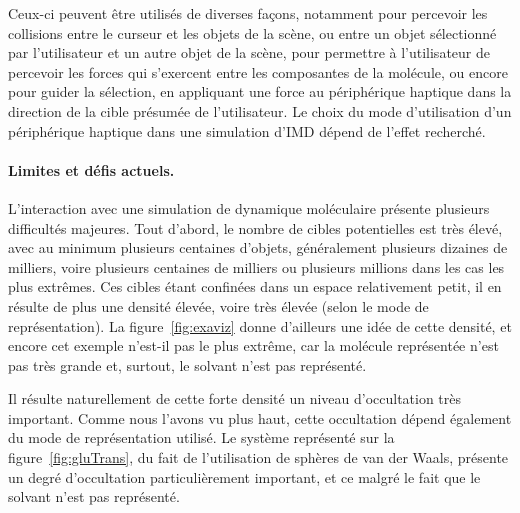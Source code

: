 	Ceux-ci peuvent être utilisés de diverses façons, notamment pour percevoir les \og collisions \fg{} entre le curseur et les objets de la scène, ou entre un objet sélectionné par l'utilisateur et un autre objet de la scène, pour permettre à l'utilisateur de percevoir les forces qui s'exercent entre les composantes de la molécule, ou encore pour guider la sélection, en appliquant une force au périphérique haptique dans la direction de la cible présumée de l'utilisateur. Le choix du mode d'utilisation d'un périphérique haptique dans une simulation d'IMD dépend de l'effet recherché.
	
	\paragraph{Limites et défis actuels.}
	L'interaction avec une simulation de dynamique moléculaire présente plusieurs difficultés majeures. Tout d'abord, le nombre de cibles potentielles est très élevé, avec au minimum plusieurs centaines d'objets, généralement plusieurs dizaines de milliers, voire plusieurs centaines de milliers ou plusieurs millions dans les cas les plus extrêmes. Ces cibles étant confinées dans un espace relativement petit, il en résulte de plus une densité élevée, voire très élevée (selon le mode de représentation). La figure~\ref{fig:exaviz} donne d'ailleurs une idée de cette densité, et encore cet exemple n'est-il pas le plus extrême, car la molécule représentée n'est pas très grande et, surtout, le solvant n'est pas représenté.
	
	Il résulte naturellement de cette forte densité un niveau d'occultation très important. Comme nous l'avons vu plus haut, cette occultation dépend également du mode de représentation utilisé. Le système représenté sur la figure~\ref{fig:gluTrans}, du fait de l'utilisation de sphères de van der Waals, présente un degré d'occultation particulièrement important, et ce malgré le fait que le solvant n'est pas représenté.
	

